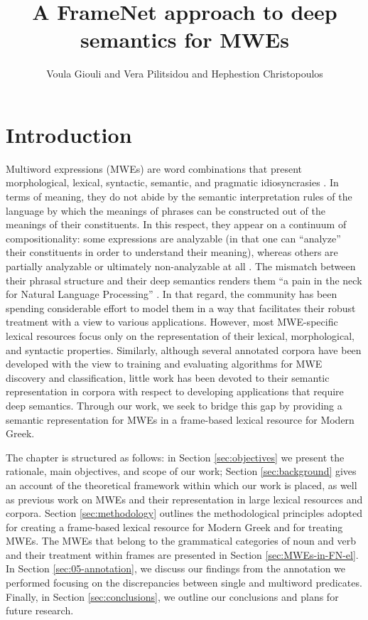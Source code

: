 \documentclass[output=paper,colorlinks,citecolor=brown]{langscibook}
\author{Voula Giouli\orcid{0000-0002-1501-9754}\affiliation{Institute for Language and Speech Processing, ATHENA Research Center, Greece} and 
Vera Pilitsidou\orcid{}\affiliation{National and Kapodistrian University of Athens, Greece} and
Hephestion Christopoulos\orcid{}\affiliation{National and Kapodistrian University of Athens, Greece}}
\title{A FrameNet approach to deep semantics for MWEs}
\begin{document}
\maketitle
\section{Introduction}
Multiword expressions (MWEs) are word combinations that present morphological, lexical, syntactic, semantic, and pragmatic idiosyncrasies \citep{gross_1982,Baldwin/Kim:10}. In terms of meaning, they do not abide by the semantic interpretation rules of the language by which the meanings of phrases can be constructed out of the meanings of their constituents. In this respect, they appear on a continuum of compositionality: some expressions are analyzable (in that one can “analyze” their constituents in order to understand their meaning), whereas others are partially analyzable or ultimately non-analyzable at all \citep{Nunberg_etal_1994}. The mismatch between their phrasal structure and their deep semantics renders them “a pain in the neck for Natural Language Processing” \citep{Sag:Baldwin:2002}. In that regard, the community has been spending considerable effort to model them in a way that facilitates their robust treatment with a view to various applications. However, most MWE-specific lexical resources focus only on the representation of their lexical, morphological, and syntactic properties. Similarly, although several annotated corpora have been developed with the view to training and evaluating algorithms for MWE discovery and classification, little work has been devoted to their semantic representation in corpora with respect to developing applications that require deep semantics. Through our work, we seek to bridge this gap by providing a semantic representation for MWEs in a frame-based lexical resource for Modern Greek.

The chapter is structured as follows: in Section \ref{sec:objectives} we present the rationale, main objectives, and scope of our work; Section \ref{sec:background} gives an account of the theoretical framework within which our work is placed, as well as previous work on MWEs and their representation in large lexical resources and corpora. Section \ref{sec:methodology} outlines the methodological principles adopted for creating a frame-based lexical resource for Modern Greek and for treating MWEs. The MWEs that belong to the grammatical categories of noun and verb and their treatment within frames are presented in Section \ref{sec:MWEs-in-FN-el}. In Section \ref{sec:05-annotation}, we discuss our findings from the annotation we performed focusing on the discrepancies between single and multiword predicates. Finally, in Section \ref{sec:conclusions}, we outline our conclusions and plans for future research.
\end{document}
